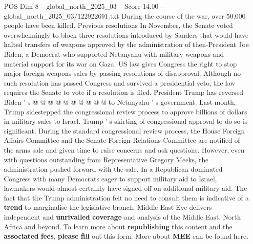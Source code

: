 \begin{textsample}{POS Dim 8 – global\_north\_2025\_03 – Score 14.00 – global\_north\_2025\_03/122922691.txt}
During the course of the war, over 50,000 people have been killed.
Previous resolutions In November, the Senate voted overwhelmingly to block three resolutions introduced by Sanders that would have halted transfers of weapons approved by the administration of then-President Joe Biden, a Democrat who supported Netanyahu with military weapons and material support for its war on Gaza.
US law gives Congress the right to stop major foreign weapons sales by passing resolutions of disapproval.
Although no such resolution has passed Congress and survived a presidential veto, the law requires the Senate to vote if a resolution is filed.
President Trump has reversed Biden ' s @ @ @ @ @ @ @ @ @ @ to Netanyahu ' s government.
Last month, Trump sidestepped the congressional review process to approve billions of dollars in military sales to Israel.
Trump ' s skirting of congressional approval to do so is significant.
During the standard congressional review process, the House Foreign Affairs Committee and the Senate Foreign Relations Committee are notified of the arms sale and given time to raise concerns and ask questions.
However, even with questions outstanding from Representative Gregory Meeks, the administration pushed forward with the sale.
In a Republican-dominated Congress with many Democrats eager to support military aid to Israel, lawmakers would almost certainly have signed off on additional military aid.
The fact that the Trump administration felt no need to consult them is indicative of a \textbf{trend} to marginalise the legislative branch.
Middle East Eye delivers independent and \textbf{unrivalled} \textbf{coverage} and analysis of the Middle East, North Africa and beyond.
To learn more about \textbf{republishing} this content and the \textbf{associated} \textbf{fees}, \textbf{please} \textbf{fill} out this form.
More about \textbf{MEE} can be found here.

\end{textsample}
